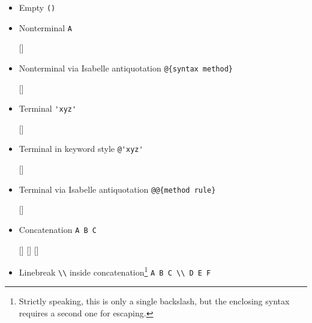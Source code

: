 \begin{isabellebody}
\begin{isamarkuptext}
  \begin{itemize}

  \item Empty \verb|()|

  \begin{railoutput}
\rail@end
\end{railoutput}


  \item Nonterminal \verb|A|

  \begin{railoutput}
[]
\rail@end
\end{railoutput}


  \item Nonterminal via Isabelle antiquotation
  \verb|@{syntax method}|

  \begin{railoutput}
[]
\rail@end
\end{railoutput}


  \item Terminal \verb|'xyz'|

  \begin{railoutput}
[]
\rail@end
\end{railoutput}


  \item Terminal in keyword style \verb|@'xyz'|

  \begin{railoutput}
[]
\rail@end
\end{railoutput}


  \item Terminal via Isabelle antiquotation
  \verb|@@{method rule}|

  \begin{railoutput}
[]
\rail@end
\end{railoutput}


  \item Concatenation \verb|A B C|

  \begin{railoutput}
[]
[]
[]
\rail@end
\end{railoutput}


  \item Linebreak \verb|\\| inside
  concatenation\footnote{Strictly speaking, this is only a single
  backslash, but the enclosing \hyperlink{syntax.string}{\mbox{}} syntax requires a
  second one for escaping.} \verb|A B C \\ D E F|


\end{itemize}
\end{isamarkuptext}
\end{isabellebody}
